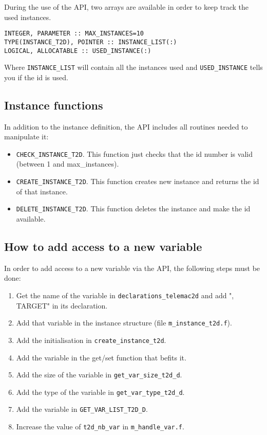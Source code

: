 During the use of the API, two arrays are available in order to keep track the
used instances.
\begin{lstlisting}
INTEGER, PARAMETER :: MAX_INSTANCES=10
TYPE(INSTANCE_T2D), POINTER :: INSTANCE_LIST(:)
LOGICAL, ALLOCATABLE :: USED_INSTANCE(:)
\end{lstlisting}

Where \verb!INSTANCE_LIST! will contain all the instances used and
\verb!USED_INSTANCE! tells you if the id is used.

\subsection{Instance functions}

In addition to the instance definition, the API includes all routines needed to
manipulate it:

\begin{itemize}
\item \verb!CHECK_INSTANCE_T2D!. This function just checks that the id number
  is valid (between 1 and max\_instances).
\item \verb!CREATE_INSTANCE_T2D!. This function creates new instance and
  returns the id of that instance.
\item \verb!DELETE_INSTANCE_T2D!. This function deletes the instance and make
  the id available.
\end{itemize}
%
\subsection{How to add access to a new variable}
\label{var_add}
%
In order to add access to a new variable via the API, the following steps must
be done:

\begin{enumerate}
\item Get the name of the variable in \verb!declarations_telemac2d! and add ",
  TARGET" in its declaration.
\item Add that variable in the instance structure (file
  \verb!m_instance_t2d.f!).
\item Add the initialisation in \verb!create_instance_t2d!.
\item Add the variable in the get/set function that befits it.
\item Add the size of the variable in \verb!get_var_size_t2d_d!.
\item Add the type of the variable in \verb!get_var_type_t2d_d!.
\item Add the variable in \verb!GET_VAR_LIST_T2D_D!.
\item Increase the value of \verb!t2d_nb_var! in \verb!m_handle_var.f!.
\end{enumerate}

